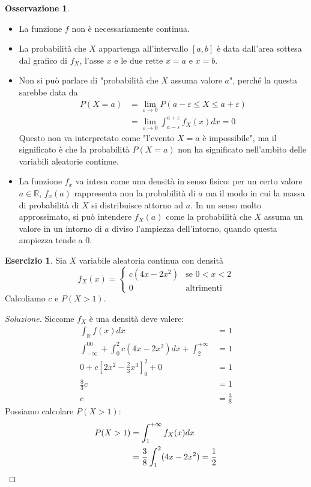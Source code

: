 \documentclass{article}
\theoremstyle{plain}
\theoremstyle{definition}
\newtheorem{osservazione}{Osservazione}[section]
\newtheorem{esercizio}{Esercizio}[section]
\theoremstyle{remark}
\newenvironment{soluzione}
	{\renewcommand\qedsymbol{$\mathwitch*$}\begin{proof}[Soluzione]}
	{\end{proof}}
\renewcommand{\qedsymbol}{$\mathrightghost$}
\begin{document}
\begin{osservazione}
	\begin{itemize}
		\item La funzione $f$ non è necessariamente continua.
		\item La probabilità che $X$ appartenga all'intervallo $[a,b]$ è data dall'area sottesa dal grafico di $f_X$, l'asse $x$ e le due rette $x=a$ e $x=b$.
		\item Non si può parlare di "probabilità che $X$ assuma valore $a$", perché la questa sarebbe data da
		\begin{align*}
			P(X=a)&=\lim_{\varepsilon\to0}P(a-\varepsilon\leq X\leq a+\varepsilon)\\
			&=\lim_{\varepsilon\to0}\int_{a-\varepsilon}^{a+\varepsilon}f_X(x)dx=0
		\end{align*}
		Questo non va interpretato come "l'evento $X=a$ è impossibile", ma il significato è che la probabilità $P(X=a)$ non ha significato nell'ambito delle variabili aleatorie continue.
		\item La funzione $f_x$ va intesa come una densità in senso fisico: per un certo valore $a\in\mathds{R}$, $f_x(a)$ rappresenta non la probabilità di $a$ ma il modo in cui la massa di probabilità di $X$ si distribuisce attorno ad $a$. In un senso molto approssimato, si può intendere $f_X(a)$ come la probabilità che $X$ assuma un valore in un intorno di $a$ diviso l'ampiezza dell'intorno, quando questa ampiezza tende a $0$.
	\end{itemize}
\end{osservazione}
\begin{esercizio}
	Sia $X$ variabile aleatoria continua con densità
	\begin{equation*}
		f_X(x)=
		\begin{cases}
			c(4x-2x^2)&\text{se }0<x<2\\
			0&\text{altrimenti}
		\end{cases}
	\end{equation*}
	Calcoliamo $c$ e $P(X>1)$.
	\begin{soluzione}
		Siccome $f_X$ è una densità deve valere:
		\begin{align*}
			\int_\mathds{R}f(x)dx&=1\\
			\int_{-\infty}^00+\int_0^2c(4x-2x^2)dx+\int_2^{+\infty}&=1\\
			0+c\left[2x^2-\frac{2}{3}x^3\right]_0^2+0&=1\\
			\frac{8}{3}c&=1\\
			c&=\frac{3}{8}
		\end{align*}
		Possiamo calcolare $P(X>1)$:
		\begin{align*}
			P(X>1)&=\int_1^{+\infty}f_X(x)dx\\
			&=\frac{3}{8}\int_1^2(4x-2x^2)=\frac{1}{2}\qedhere
		\end{align*}
	\end{soluzione}
\end{esercizio}
\end{document}
